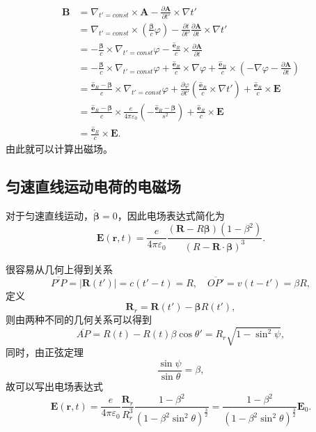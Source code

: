 \documentclass[UTF8]{ctexbook}
\renewcommand{\b}{\boldsymbol}
\numberwithin{equation}{chapter}
\begin{document}
	\begin{align*}
		\b{B}&=\nabla_{t'=const}\times\b{A}-\frac{\partial \b{A}}{\partial t'}\times\nabla t' \\
		 &=\nabla_{t'=const}\times\left(\frac{\b{\beta}}{c}\varphi\right)-\frac{\partial t}{\partial t'}\frac{\partial \b{A}}{\partial t}\times\nabla t' \\
		 &=-\frac{\b{\beta}}{c}\times\nabla_{t'=const}\varphi-\frac{\hat{\b{e}}_R}{c}\times\frac{\partial \b{A}}{\partial t} \\
		 &=-\frac{\b{\beta}}{c}\times\nabla_{t'=const}\varphi+\frac{\hat{\b{e}}_R}{c}\times\nabla\varphi+\frac{\hat{\b{e}}_R}{c}\times\left(-\nabla\varphi-\frac{\partial \b{A}}{\partial t}\right) \\
		 &=\frac{\hat{\b{e}}_R-\b{\beta}}{c}\times\nabla_{t'=const}\varphi+\frac{\partial \varphi}{\partial t'}\left(\frac{\hat{\b{e}}_R}{c}\times\nabla t'\right)+\frac{\hat{\b{e}}_R}{c}\times\b{E} \\
		 &=\frac{\hat{\b{e}}_R-\b{\beta}}{c}\times\frac{e}{4\pi\varepsilon_0}\left(-\frac{\hat{\b{e}}_R-\b{\beta}}{s^2}\right)+\frac{\hat{\b{e}}_R}{c}\times\b{E} \\
		 &=\frac{\hat{\b{e}}_R}{c}\times\b{E}.
	 \end{align*}
	由此就可以计算出磁场。
	
	\subsection{匀速直线运动电荷的电磁场}
	
	对于匀速直线运动，$\dot{\b{\beta}}=0$，因此电场表达式简化为
	\[\b{E}(\b{r},t)=\frac{e}{4\pi\varepsilon_0}\frac{(\b{R}-R\b{\beta})(1-\beta^2)}{(R-\b{R}\cdot\b{\beta})^3}.\]
	
	\begin{figure}[H]
		\centering
	\end{figure}
	
	很容易从几何上得到关系
	\[\overline{P'P}=|\b{R}(t')|=c(t'-t)=R,\quad \overline{OP'}=v(t-t')=\beta R,\]
	定义
	\[\b{R}_r=\b{R}(t')-\b{\beta}R(t'),\]
	则由两种不同的几何关系可以得到
	\[\overline{AP}=R(t)-R(t)\beta\cos\theta'=R_r\sqrt{1-\sin^2\psi},\]
	同时，由正弦定理
	\[\frac{\sin\psi}{\sin\theta}=\beta,\]
	故可以写出电场表达式
	\[\b{E}(\b{r},t)=\frac{e}{4\pi\varepsilon_0}\frac{\b{R}_r}{R_r^3}\frac{1-\beta^2}{(1-\beta^2\sin^2\theta)^\frac{3}{2}}=\frac{1-\beta^2}{(1-\beta^2\sin^2\theta)^{\frac{3}{2}}}\b{E}_0.\]
	
\end{document}
